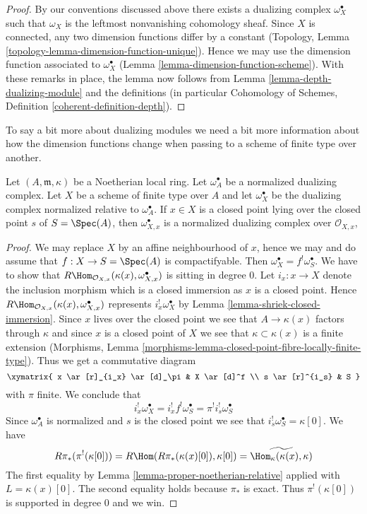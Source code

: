\begin{proof}
By our conventions discussed above there exists a dualizing complex
$\omega_X^\bullet$ such that $\omega_X$ is the leftmost nonvanishing
cohomology sheaf. Since $X$ is connected, any two dimension functions
differ by a constant
(Topology, Lemma \ref{topology-lemma-dimension-function-unique}).
Hence we may use the
dimension function associated to $\omega_X^\bullet$
(Lemma \ref{lemma-dimension-function-scheme}).
With these remarks in place, the lemma now
follows from Lemma \ref{lemma-depth-dualizing-module}
and the definitions (in particular
Cohomology of Schemes, Definition \ref{coherent-definition-depth}).
\end{proof}

\noindent
To say a bit more about dualizing modules we need a bit more information
about how the dimension functions change when passing to a scheme
of finite type over another.

\begin{lemma}
\label{lemma-good-dualizing-normalized}
Let $(A, \mathfrak m, \kappa)$ be a Noetherian local ring.
Let $\omega_A^\bullet$ be a normalized dualizing complex.
Let $X$ be a scheme of finite type over $A$ and let
$\omega_X^\bullet$ be the dualizing complex normalized relative
to $\omega_A^\bullet$. If $x \in X$ is a closed point
lying over the closed point $s$ of $S = \Spec(A)$, then
$\omega_{X, x}^\bullet$
is a normalized dualizing complex over $\mathcal{O}_{X, x}$,
\end{lemma}

\begin{proof}
We may replace $X$ by an affine neighbourhood of $x$, hence we may
and do assume that $f : X \to S = \Spec(A)$ is compactifyable.
Then $\omega_X^\bullet = f^!\omega_S^\bullet$. We have to show that
$R\Hom_{\mathcal{O}_{X, x}}(\kappa(x), \omega_{X, x}^\bullet)$
is sitting in degree $0$. Let $i_x : x \to X$ denote the inclusion
morphism which is a closed immersion as $x$ is a closed point.
Hence $R\Hom_{\mathcal{O}_{X, x}}(\kappa(x), \omega_{X, x}^\bullet)$
represents $i_x^!\omega_X^\bullet$ by
Lemma \ref{lemma-shriek-closed-immersion}.
Since $x$ lives over the closed point we see that
$A \to \kappa(x)$ factors through $\kappa$ and since $x$
is a closed point of $X$ we see that
$\kappa \subset \kappa(x)$ is a finite extension
(Morphisms, Lemma
\ref{morphisms-lemma-closed-point-fibre-locally-finite-type}).
Thus we get a commutative diagram
$$
\xymatrix{
x \ar[r]_{i_x} \ar[d]_\pi & X \ar[d]^f \\
s \ar[r]^{i_s} & S
}
$$
with $\pi$ finite. We conclude that
$$
i_x^!\omega_X^\bullet = i_x^! f^! \omega_S^\bullet =
\pi^! i_s^! \omega_S^\bullet
$$
Since $\omega_A^\bullet$ is normalized and $s$ is the closed
point we see that $i_s^!\omega_S^\bullet = \kappa[0]$. We have
$$
R\pi_*(\pi^!(\kappa[0])) = R\Hom(R\pi_*(\kappa(x)[0]), \kappa[0]) =
\widetilde{\Hom_\kappa(\kappa(x), \kappa)}
$$
The first equality by Lemma \ref{lemma-proper-noetherian-relative}
applied with $L = \kappa(x)[0]$. The second equality holds because
$\pi_*$ is exact.
Thus $\pi^!(\kappa[0])$ is supported in degree $0$ and we win.
\end{proof}

